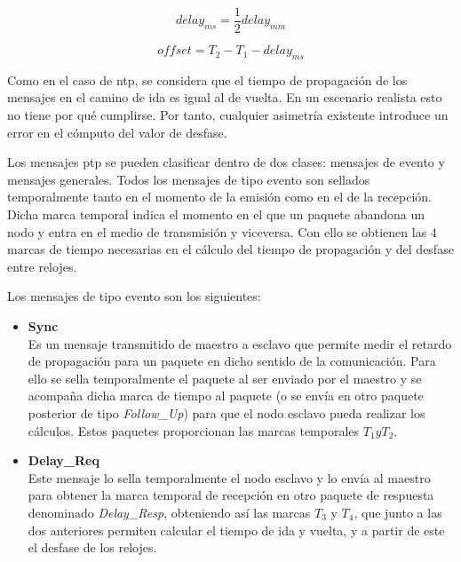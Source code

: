 \begin{equation}\label{delms}
	delay_{ms} = \frac {1} {2} delay_{mm}
\end{equation}

\begin{equation}\label{offset}
	offset = T_2 - T_1 - delay_{ms}
\end{equation}

Como en el caso de \gls{ntp}, se considera que el tiempo de propagación de los 
mensajes en el camino de ida es igual al de vuelta. En un escenario realista 
esto no tiene por qué cumplirse. Por tanto, cualquier asimetría existente 
introduce un error en el cómputo del valor de desfase.

Los mensajes \gls{ptp} se pueden clasificar dentro de dos clases: mensajes de 
evento y mensajes generales. Todos los mensajes de tipo evento son sellados 
temporalmente tanto en el momento de la emisión como en el de la recepción. 
Dicha marca temporal indica el momento en el que un paquete abandona un nodo y 
entra en el medio de transmisión y viceversa. Con ello se obtienen las 4 
marcas de tiempo necesarias en el cálculo del tiempo de propagación y del 
desfase entre relojes.

Los mensajes de tipo evento son los siguientes:


\begin{itemize}
	
	\item \textbf{Sync} \\
	Es un mensaje transmitido de maestro a esclavo que permite medir el retardo 
	de propagación para un paquete en dicho sentido de la comunicación. Para 
	ello 
	se sella temporalmente el paquete al ser enviado por el maestro y se 
	acompaña dicha marca de tiempo al paquete (o se envía en otro paquete 
	posterior de tipo \textit{Follow\_Up}) para que el nodo esclavo pueda 
	realizar los cálculos. Estos paquetes proporcionan las marcas temporales 
	$T_1 y T_2$.
	
	\item \textbf{Delay\_Req} \\
	Este mensaje lo sella temporalmente el nodo esclavo y lo envía al maestro 
	para obtener la marca temporal de recepción en otro paquete de respuesta 
	denominado \textit{Delay\_Resp}, obteniendo así las marcas $T_3$ y $T_4$, 
	que 
	junto a las dos anteriores permiten calcular el tiempo de ida y vuelta, y a 
	partir de este el desfase de los relojes.
\end{itemize}

